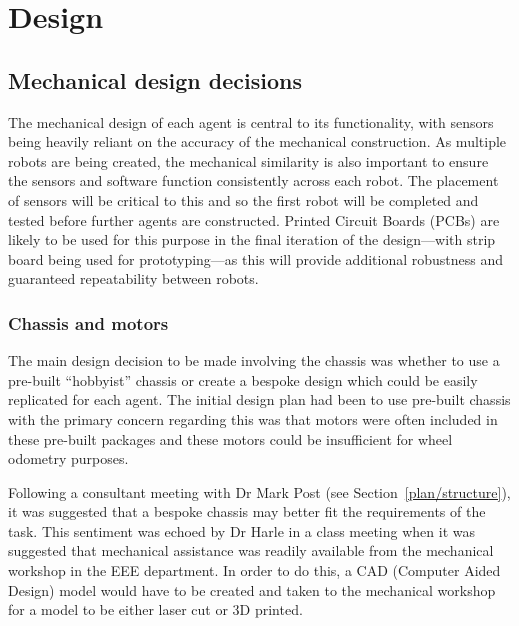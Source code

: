 
\section{Design}\label{design}
\thispagestyle{plain}

\subsection{Mechanical design decisions}\label{design/mechanical}

The mechanical design of each agent is central to its functionality, with sensors being heavily reliant on the accuracy of the mechanical
construction. As multiple robots are being created, the mechanical similarity is
also important to ensure the sensors and software function consistently across each robot. The placement of sensors will be critical to this and
so the first robot will be completed and tested before further agents are constructed.
Printed Circuit Boards (PCBs) are likely to be used for this purpose in the
final iteration of the design---with strip board being used for prototyping---as this will provide additional robustness and guaranteed
repeatability between robots.

\subsubsection{Chassis and motors}\label{design/mechanical/chassis}

The main design decision to be made involving the chassis was whether to
use a pre-built ``hobbyist'' chassis or create a bespoke design which could
be easily replicated for each agent. The initial design plan had been to
use pre-built chassis with the primary concern regarding this was that
motors were often included in these pre-built packages and these motors
could be insufficient for wheel odometry purposes.

Following a consultant meeting with Dr Mark Post (see Section~\ref{plan/structure}),
it was suggested that a bespoke chassis may better fit
the requirements of the task. This sentiment was echoed by Dr Harle in a
class meeting when it was suggested that mechanical assistance was readily
available from the mechanical workshop in the EEE department. In order to
do this, a CAD (Computer Aided Design) model would have to be created and
taken to the mechanical workshop for a model to be either laser cut or 3D
printed.

